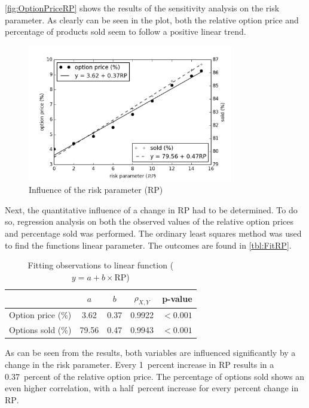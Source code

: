 \autoref{fig:OptionPriceRP} shows the results of the sensitivity analysis on the risk parameter. As clearly can be seen in the plot, both the relative option price and percentage of products sold seem to follow a positive linear trend.

\begin{figure}
    \centering
    \includegraphics[width=0.8\textwidth]{figures/OptionPrice_RP.png}
    \caption{Influence of the risk parameter ($\mbox{RP}$)}
    \label{fig:OptionPriceRP}
\end{figure}

Next, the quantitative influence of a change in $\mbox{RP}$ had to be determined. To do so, regression analysis on both the observed values of the relative option prices and percentage sold was performed. The ordinary least squares method was used to find the functions linear parameter. The outcomes are found in \autoref{tbl:FitRP}.

\begin{table}
\centering
\begin{tabular}{l c c c c}
\toprule
~  &  $a$  &  $b$  &  $\rho_{X,Y}$  & p-value  \\
\midrule
Option price (\%)  &  3.62   &  0.37  &  0.9922  &  $< 0.001$ \\
Options sold (\%)  &  79.56  &  0.47  &  0.9943  &  $< 0.001$ \\
\bottomrule
\end{tabular}
\caption{Fitting observations to linear function ($y = a + b \times \mbox{RP}$)}
\label{tbl:FitRP}
\end{table}


As can be seen from the results, both variables are influenced significantly by a change in the risk parameter. Every 1~percent increase in $\mbox{RP}$ results in a 0.37~percent of the relative option price. The percentage of options sold shows an even higher correlation, with a half~percent increase for every percent change in $\mbox{RP}$.

